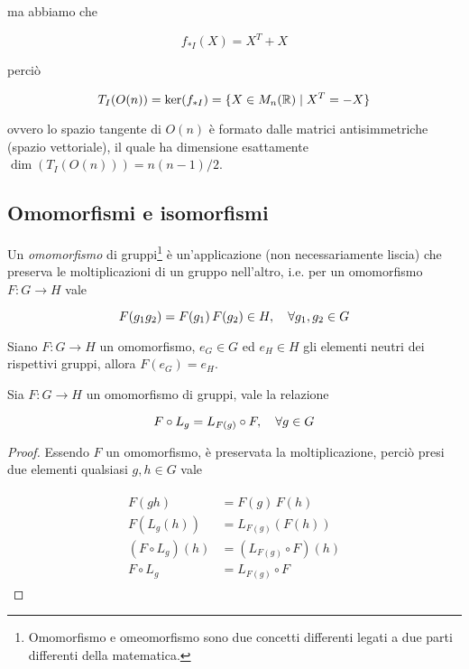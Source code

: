 ma abbiamo che

\begin{equation}
	f_{*I}(X) = X^{T} + X
\end{equation}

perciò

\begin{equation}
	T_{I}(O(n)) = \ker(f_{*I}) = \{ X \in M_{n}(\mathbb{R}) \mid X^{T} = -X \}
\end{equation}

ovvero lo spazio tangente di $ O(n) $ è formato dalle matrici antisimmetriche (spazio vettoriale), il quale ha dimensione esattamente $ \dim(T_{I}(O(n))) = n(n-1)/2 $.

\subsection{Omomorfismi e isomorfismi}

Un \textit{omomorfismo} di gruppi\footnote{%
	Omomorfismo e omeomorfismo sono due concetti differenti legati a due parti differenti della matematica.%
} è un'applicazione (non necessariamente liscia) che preserva le moltiplicazioni di un gruppo nell'altro, i.e. per un omomorfismo $ F : G \to H $ vale

\begin{equation}
	F(g_{1} g_{2}) = F(g_{1}) \, F(g_{2}) \in H \qcomma \forall g_{1},g_{2} \in G
\end{equation}

\begin{remark}
Siano $ F : G \to H $ un omomorfismo, $ e_{G} \in G $ ed $ e_{H} \in H $ gli elementi neutri dei rispettivi gruppi, allora $ F(e_{G}) = e_{H} $.
\end{remark}

\begin{definition}
	Sia $ F : G \to H $ un omomorfismo di gruppi, vale la relazione
	
	\begin{equation}
		F \circ L_{g} = L_{F(g)} \circ F \qcomma \forall g \in G
	\end{equation}
\end{definition}

\begin{proof}
	Essendo $ F $ un omomorfismo, è preservata la moltiplicazione, perciò presi due elementi qualsiasi $ g,h \in G $ vale
	
	\begin{align}
		\begin{split}
			F(g h) &= F(g) \, F(h) \\
			F(L_{g}(h)) &= L_{F(g)}(F(h)) \\
			(F \circ L_{g})(h) &= (L_{F(g)} \circ F)(h) \\
			F \circ L_{g} &= L_{F(g)} \circ F
		\end{split}
	\end{align}
\end{proof}

